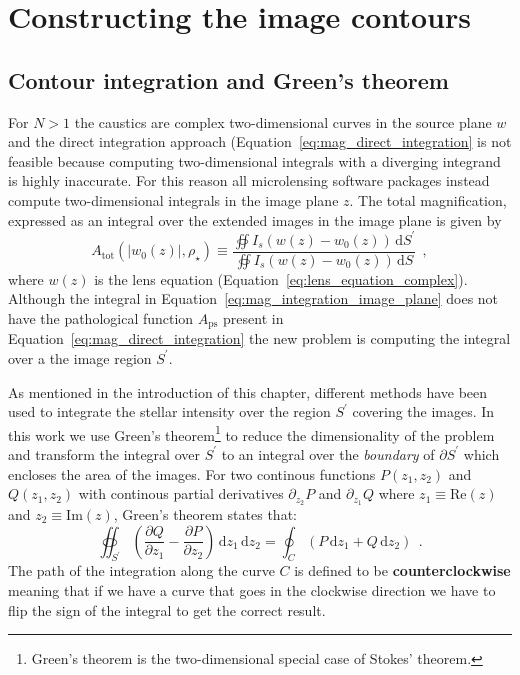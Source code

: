 \documentclass[12pt,dvipsnames]{report}
\newcommand{\ud}{\,\mathrm{d}}
\newcommand{\hquad}{~~}
\begin{document}
\section{Constructing the image contours}
\subsection{Contour integration and Green's theorem}
For $N>1$ the caustics are complex two-dimensional curves in the source plane
$w$ and the direct integration approach (Equation~\ref{eq:mag_direct_integration} is not 
feasible because computing two-dimensional integrals with a diverging integrand is 
highly inaccurate. For this reason all microlensing software packages instead 
compute two-dimensional integrals in the image plane $z$. The total magnification, 
expressed as an integral over the extended images in the image plane is given by
\begin{equation}
    A_\mathrm{tot}(|w_0(z)|,\rho_\star)\equiv \frac{\oiint I_s(w(z) - w_0(z))\ud S^\prime}{
        \oiint I_s(w(z) - w_0(z))\ud S}\hquad,
    \label{eq:mag_integration_image_plane}
\end{equation}
where $w(z)$ is the lens equation (Equation~\ref{eq:lens_equation_complex}).
Although the integral in Equation~\ref{eq:mag_integration_image_plane} does not have the
pathological function $A_\mathrm{ps}$ present in Equation~\ref{eq:mag_direct_integration} 
the new problem is computing the integral over a the image region $S^\prime$.

As mentioned in the introduction of this chapter, different methods have been used to 
integrate the stellar intensity over the region $S^\prime$ covering the images. 
In this work we use Green's theorem\footnote{Green's theorem is the two-dimensional special case of
    Stokes' theorem.} to reduce the dimensionality of the problem and transform the
integral over $S^\prime$ to an integral over the \emph{boundary} of $\partial S^\prime$ 
which encloses the area of the images.
For two continous functions $P(z_1, z_2)$ and $Q(z_1, z_2)$
with continous partial derivatives $\partial_{z_2}P$ and $\partial_{z_1}Q$ where 
$z_1\equiv\mathrm{Re}(z)$ and $z_2\equiv\mathrm{Im}(z)$, Green's theorem states that:
\begin{equation}
    \oiint_{{S}^\prime}\left(\frac{\partial Q}{\partial z_{1}}-
    \frac{\partial P}{\partial z_{2}} \right) \ud z_{1} \ud z_{2}= \oint_{C} (P \ud z_{1}+Q \ud
    z_{2})\hquad . \label{eq:green_theorem}
\end{equation}
The path of the integration along the curve $C$ is defined to be
\textbf{counterclockwise} meaning that if we have a curve that goes in the clockwise
direction we have to flip the sign of the integral to get the correct result.
\end{document}
